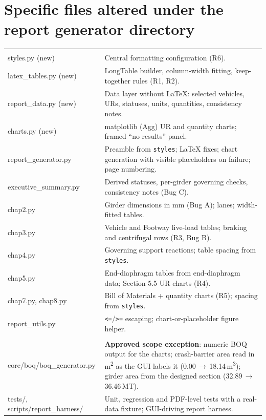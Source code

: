 \documentclass[10pt,a4paper]{article}
\newcommand{\f}[1]{\texttt{#1}}
\begin{document}
\section{Specific files altered under the report generator directory}
\begin{longtable}{@{}>{\ttfamily}p{4.8cm}p{12.3cm}@{}}
\multicolumn{2}{@{}l}{\textit{\f{src/osdagbridge/core/reports/}}}\\
styles.py \textrm{(new)} & Central formatting configuration (R6).\\
latex\_tables.py \textrm{(new)} & LongTable builder, column-width fitting, keep-together rules (R1, R2).\\
report\_data.py \textrm{(new)} & Data layer without LaTeX: selected vehicles, URs, statuses, units, quantities, consistency notes.\\
charts.py \textrm{(new)} & matplotlib (Agg) UR and quantity charts; framed ``no results'' panel.\\
report\_generator.py & Preamble from \f{styles}; LaTeX fixes; chart generation with visible placeholders on failure; page numbering.\\
executive\_summary.py & Derived statuses, per-girder governing checks, consistency notes (Bug C).\\
chap2.py & Girder dimensions in mm (Bug A); lanes; width-fitted tables.\\
chap3.py & Vehicle and Footway live-load tables; braking and centrifugal rows (R3, Bug B).\\
chap4.py & Governing support reactions; table spacing from \f{styles}.\\
chap5.py & End-diaphragm tables from end-diaphragm data; Section 5.5 UR charts (R4).\\
chap7.py, chap8.py & Bill of Materials + quantity charts (R5); spacing from \f{styles}.\\
report\_utils.py & \verb|<=|/\verb|>=| escaping; chart-or-placeholder figure helper.\\
\multicolumn{2}{@{}l}{\textit{Outside the directory}}\\
core/boq/boq\_generator.py & \textbf{Approved scope exception}: numeric BOQ output for the charts; crash-barrier area read in m\textsuperscript{2} as the GUI labels it (0.00\,$\to$\,18.14\,m\textsuperscript{3}); girder area from the designed section (32.89\,$\to$\,36.46\,MT).\\
tests/, scripts/report\_harness/ & Unit, regression and PDF-level tests with a real-data fixture; GUI-driving report harness.\\
\end{longtable}
\end{document}
